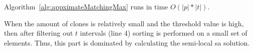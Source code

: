 \begin{corollary}
Algorithm~\ref{alg:appximateMatchingMax} runs in time $O(|p| * |t|)$.
\end{corollary}

When the amount of clones is relatively small and the threshold value is high, then after filtering out $t$ intervals (line 4) sorting is performed on a small set of elements.
Thus, this part is dominated by calculating the semi-local sa solution.


 
